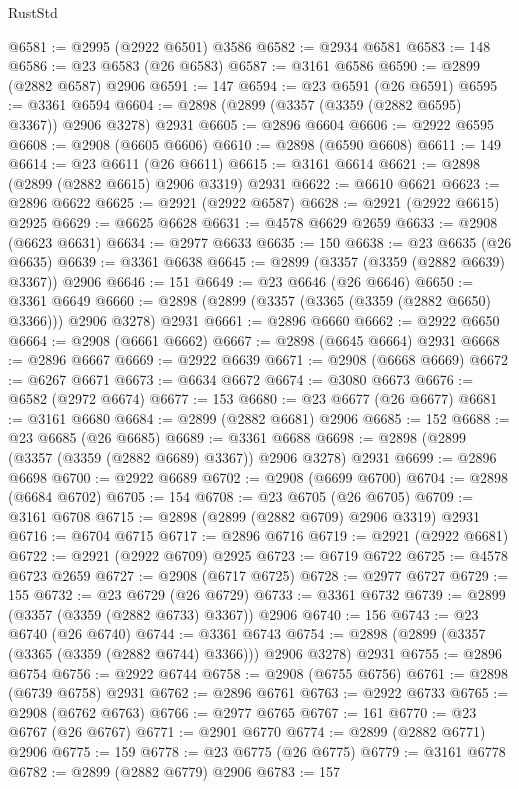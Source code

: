 \begin{lexlean}{RustStd}
\begin{coremodule}
@6581 := @2995 (@2922 @6501) @3586
@6582 := @2934 @6581
@6583 := 148
@6586 := @23 @6583 (@26 @6583)
@6587 := @3161 @6586
@6590 := @2899 (@2882 @6587) @2906
@6591 := 147
@6594 := @23 @6591 (@26 @6591)
@6595 := @3361 @6594
@6604 := @2898 (@2899 (@3357 (@3359 (@2882 @6595) @3367)) @2906 @3278) @2931
@6605 := @2896 @6604
@6606 := @2922 @6595
@6608 := @2908 (@6605 @6606)
@6610 := @2898 (@6590 @6608)
@6611 := 149
@6614 := @23 @6611 (@26 @6611)
@6615 := @3161 @6614
@6621 := @2898 (@2899 (@2882 @6615) @2906 @3319) @2931
@6622 := @6610 @6621
@6623 := @2896 @6622
@6625 := @2921 (@2922 @6587)
@6628 := @2921 (@2922 @6615) @2925
@6629 := @6625 @6628
@6631 := @4578 @6629 @2659
@6633 := @2908 (@6623 @6631)
@6634 := @2977 @6633
@6635 := 150
@6638 := @23 @6635 (@26 @6635)
@6639 := @3361 @6638
@6645 := @2899 (@3357 (@3359 (@2882 @6639) @3367)) @2906
@6646 := 151
@6649 := @23 @6646 (@26 @6646)
@6650 := @3361 @6649
@6660 := @2898 (@2899 (@3357 (@3365 (@3359 (@2882 @6650) @3366))) @2906 @3278) @2931
@6661 := @2896 @6660
@6662 := @2922 @6650
@6664 := @2908 (@6661 @6662)
@6667 := @2898 (@6645 @6664) @2931
@6668 := @2896 @6667
@6669 := @2922 @6639
@6671 := @2908 (@6668 @6669)
@6672 := @6267 @6671
@6673 := @6634 @6672
@6674 := @3080 @6673
@6676 := @6582 (@2972 @6674)
@6677 := 153
@6680 := @23 @6677 (@26 @6677)
@6681 := @3161 @6680
@6684 := @2899 (@2882 @6681) @2906
@6685 := 152
@6688 := @23 @6685 (@26 @6685)
@6689 := @3361 @6688
@6698 := @2898 (@2899 (@3357 (@3359 (@2882 @6689) @3367)) @2906 @3278) @2931
@6699 := @2896 @6698
@6700 := @2922 @6689
@6702 := @2908 (@6699 @6700)
@6704 := @2898 (@6684 @6702)
@6705 := 154
@6708 := @23 @6705 (@26 @6705)
@6709 := @3161 @6708
@6715 := @2898 (@2899 (@2882 @6709) @2906 @3319) @2931
@6716 := @6704 @6715
@6717 := @2896 @6716
@6719 := @2921 (@2922 @6681)
@6722 := @2921 (@2922 @6709) @2925
@6723 := @6719 @6722
@6725 := @4578 @6723 @2659
@6727 := @2908 (@6717 @6725)
@6728 := @2977 @6727
@6729 := 155
@6732 := @23 @6729 (@26 @6729)
@6733 := @3361 @6732
@6739 := @2899 (@3357 (@3359 (@2882 @6733) @3367)) @2906
@6740 := 156
@6743 := @23 @6740 (@26 @6740)
@6744 := @3361 @6743
@6754 := @2898 (@2899 (@3357 (@3365 (@3359 (@2882 @6744) @3366))) @2906 @3278) @2931
@6755 := @2896 @6754
@6756 := @2922 @6744
@6758 := @2908 (@6755 @6756)
@6761 := @2898 (@6739 @6758) @2931
@6762 := @2896 @6761
@6763 := @2922 @6733
@6765 := @2908 (@6762 @6763)
@6766 := @2977 @6765
@6767 := 161
@6770 := @23 @6767 (@26 @6767)
@6771 := @2901 @6770
@6774 := @2899 (@2882 @6771) @2906
@6775 := 159
@6778 := @23 @6775 (@26 @6775)
@6779 := @3161 @6778
@6782 := @2899 (@2882 @6779) @2906
@6783 := 157

\end{coremodule}
\end{lexlean}
